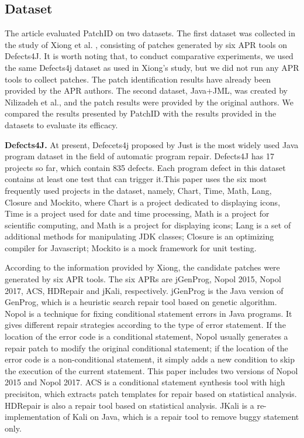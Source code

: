 \subsection{Dataset}\label{5.1}
The article evaluated PatchID on two datasets. The first dataset was collected in the study of Xiong et al. \cite{ref8}, consisting of patches generated by six APR tools on Defects4J. It is worth noting that, to conduct comparative experiments, we used the same Defects4j dataset as used in Xiong's study, but we did not run any APR tools to collect patches. The patch identification results have already been provided by the APR authors. The second dataset, Java+JML, was created by Nilizadeh et al., and the patch results were provided by the original authors. We compared the results presented by PatchID with the results provided in the datasets to evaluate its efficacy.

\textbf{Defects4J.} At present, Defecets4j proposed by Just\cite{ref59} is the most widely used Java program dataset in the field of automatic program repair. Defects4J has 17 projects so far, which contain 835 defects. Each program defect in this dataset contains at least one test that can trigger it.This paper uses the six most frequently used projects in the dataset, namely, Chart, Time, Math, Lang, Closure and Mockito, where Chart is a project dedicated to displaying icons, Time is a project used for date and time processing, Math is a project for scientific computing, and Math is a project for displaying icons; Lang is a set of additional methods for manipulating JDK classes; Closure is an optimizing compiler for Javascript; Mockito is a mock framework for unit testing.

According to the information provided by Xiong, the candidate patches were generated by six APR tools. The six APRs are jGenProg, Nopol 2015, Nopol 2017, ACS, HDRepair and jKali, respectively. jGenProg is the Java version of GenProg, which is a heuristic search repair tool based on genetic algorithm. Nopol is a technique for fixing conditional statement errors in Java programs. It gives different repair strategies according to the type of error statement. If the location of the error code is a conditional statement, Nopol usually generates a repair patch to modify the original conditional statement; if the location of the error code is a non-conditional statement, it simply adds a new condition to skip the execution of the current statement. This paper includes two versions of Nopol 2015 and Nopol 2017. ACS is a conditional statement synthesis tool with high precisiton, which extracts patch templates for repair based on statistical analysis. HDRepair is also a repair tool based on statistical analysis. JKali is a re-implementation of Kali on Java, which is a repair tool to remove buggy statement only.

